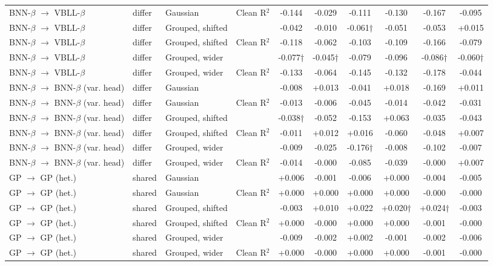 \begin{landscape}
{\begin{longtable}{llllcccccc}
BNN-$\beta$ $\rightarrow$ VBLL-$\beta$ & differ & Gaussian & Clean R$^2$ & -0.144 & -0.029 & -0.111 & -0.130 & -0.167 & -0.095 \\
BNN-$\beta$ $\rightarrow$ VBLL-$\beta$ & differ & Grouped, shifted & \aucnorm{} & -0.042 & -0.010 & -0.061† & -0.051 & -0.053 & +0.015 \\
BNN-$\beta$ $\rightarrow$ VBLL-$\beta$ & differ & Grouped, shifted & Clean R$^2$ & -0.118 & -0.062 & -0.103 & -0.109 & -0.166 & -0.079 \\
BNN-$\beta$ $\rightarrow$ VBLL-$\beta$ & differ & Grouped, wider & \aucnorm{} & -0.077† & -0.045† & -0.079 & -0.096 & -0.086† & -0.060† \\
BNN-$\beta$ $\rightarrow$ VBLL-$\beta$ & differ & Grouped, wider & Clean R$^2$ & -0.133 & -0.064 & -0.145 & -0.132 & -0.178 & -0.044 \\
BNN-$\beta$ $\rightarrow$ BNN-$\beta$ (var. head) & differ & Gaussian & \aucnorm{} & -0.008 & +0.013 & -0.041 & +0.018 & -0.169 & +0.011 \\
BNN-$\beta$ $\rightarrow$ BNN-$\beta$ (var. head) & differ & Gaussian & Clean R$^2$ & -0.013 & -0.006 & -0.045 & -0.014 & -0.042 & -0.031 \\
BNN-$\beta$ $\rightarrow$ BNN-$\beta$ (var. head) & differ & Grouped, shifted & \aucnorm{} & -0.038† & -0.052 & -0.153 & +0.063 & -0.035 & -0.043 \\
BNN-$\beta$ $\rightarrow$ BNN-$\beta$ (var. head) & differ & Grouped, shifted & Clean R$^2$ & -0.011 & +0.012 & +0.016 & -0.060 & -0.048 & +0.007 \\
BNN-$\beta$ $\rightarrow$ BNN-$\beta$ (var. head) & differ & Grouped, wider & \aucnorm{} & -0.009 & -0.025 & -0.176† & -0.008 & -0.102 & -0.007 \\
BNN-$\beta$ $\rightarrow$ BNN-$\beta$ (var. head) & differ & Grouped, wider & Clean R$^2$ & -0.014 & -0.000 & -0.085 & -0.039 & -0.000 & +0.007 \\
GP $\rightarrow$ GP (het.) & shared & Gaussian & \aucnorm{} & +0.006 & -0.001 & -0.006 & +0.000 & -0.004 & -0.005 \\
GP $\rightarrow$ GP (het.) & shared & Gaussian & Clean R$^2$ & +0.000 & +0.000 & +0.000 & +0.000 & -0.000 & -0.000 \\
GP $\rightarrow$ GP (het.) & shared & Grouped, shifted & \aucnorm{} & -0.003 & +0.010 & +0.022 & +0.020† & +0.024† & -0.003 \\
GP $\rightarrow$ GP (het.) & shared & Grouped, shifted & Clean R$^2$ & +0.000 & -0.000 & +0.000 & +0.000 & -0.001 & -0.000 \\
GP $\rightarrow$ GP (het.) & shared & Grouped, wider & \aucnorm{} & -0.009 & -0.002 & +0.002 & -0.001 & -0.002 & -0.006 \\
GP $\rightarrow$ GP (het.) & shared & Grouped, wider & Clean R$^2$ & +0.000 & -0.000 & +0.000 & +0.000 & -0.001 & -0.000 \\
\bottomrule
\end{longtable}}


\end{landscape}
